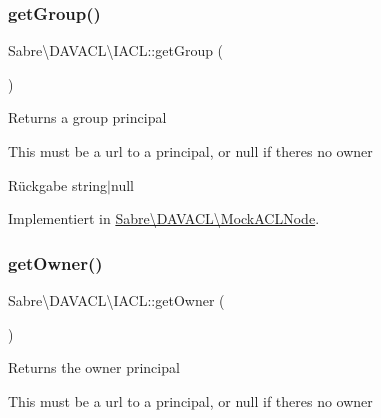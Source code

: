 \mbox{\label{interface_sabre_1_1_d_a_v_a_c_l_1_1_i_a_c_l_a8ba38d5a99d771d7ae2719dd483515f6}} 
\subsubsection{\texorpdfstring{get\+Group()}{getGroup()}}
{\footnotesize\ttfamily Sabre\textbackslash{}\+D\+A\+V\+A\+C\+L\textbackslash{}\+I\+A\+C\+L\+::get\+Group (\begin{DoxyParamCaption}{ }\end{DoxyParamCaption})}

Returns a group principal

This must be a url to a principal, or null if there\textquotesingle{}s no owner

\begin{DoxyReturn}{Rückgabe}
string$\vert$null 
\end{DoxyReturn}


Implementiert in \mbox{\hyperlink{class_sabre_1_1_d_a_v_a_c_l_1_1_mock_a_c_l_node_af63c8a7655e4bb7eb9770369619af403}{Sabre\textbackslash{}\+D\+A\+V\+A\+C\+L\textbackslash{}\+Mock\+A\+C\+L\+Node}}.

\mbox{\label{interface_sabre_1_1_d_a_v_a_c_l_1_1_i_a_c_l_a05f531b4ae1a86eab4e6e95b0413390e}} 
\subsubsection{\texorpdfstring{get\+Owner()}{getOwner()}}
{\footnotesize\ttfamily Sabre\textbackslash{}\+D\+A\+V\+A\+C\+L\textbackslash{}\+I\+A\+C\+L\+::get\+Owner (\begin{DoxyParamCaption}{ }\end{DoxyParamCaption})}

Returns the owner principal

This must be a url to a principal, or null if there\textquotesingle{}s no owner

